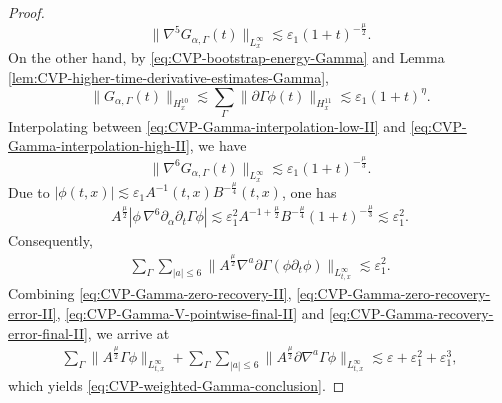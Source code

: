 \documentclass[11pt,twoside]{article}
\def\p{\partial}
\def\ve{\varepsilon}
\def\ls{\lesssim}
\theoremstyle{plain}
\theoremstyle{definition}
\theoremstyle{assumption}
\numberwithin{equation}{section}
\begin{document}
\begin{proof}
\begin{equation}
			\|\nabla^{5}G_{\alpha,\Gamma}(t)\|_{L^\infty_x}
			\ls
			\ve_1(1+t)^{-\frac{\mu}{2}}.
		\end{equation}
		On the other hand, by \eqref{eq:CVP-bootstrap-energy-Gamma} and Lemma \ref{lem:CVP-higher-time-derivative-estimates-Gamma},
		\begin{equation}
			\label{eq:CVP-Gamma-interpolation-high-II}
			\|G_{\alpha,\Gamma}(t)\|_{H^{10}_x}
			\ls
			\sum_{\Gamma}
			\|\p\Gamma\phi(t)\|_{H^{11}_x}
			\ls
			\ve_1(1+t)^\eta.
		\end{equation}
		Interpolating between
		\eqref{eq:CVP-Gamma-interpolation-low-II} and
		\eqref{eq:CVP-Gamma-interpolation-high-II}, we have
		\begin{equation}
			\label{eq:CVP-Gamma-interpolation-top-II}
			\|\nabla^{6}G_{\alpha,\Gamma}(t)\|_{L^\infty_x}
			\ls
			\ve_1(1+t)^{-\frac{\mu}{3}}.
		\end{equation}
		Due to $|\phi(t,x)|
		\ls
		\ve_1 A^{-1}(t,x)B^{-\frac{\mu}{4}}(t,x)$,
		one has
		\begin{equation}
			\label{eq:CVP-Gamma-recovery-top-error-II}
			\begin{aligned}
				A^{\frac{\mu}{2}}
				|\phi\,\nabla^{6}\p_\alpha\p_t\Gamma\phi|
				\ls
				\ve_1^2
				A^{-1+\frac{\mu}{2}}
				B^{-\frac{\mu}{4}}
				(1+t)^{-\frac{\mu}{3}}
				\ls
				\ve_1^2.
			\end{aligned}
		\end{equation}
		Consequently,
		\begin{equation}
			\label{eq:CVP-Gamma-recovery-error-final-II}
			\begin{aligned}
				\sum_{\Gamma}
				\sum_{|a|\le 6}
				\big\|
				A^{\frac{\mu}{2}}
				\nabla^a\p\Gamma(\phi\p_t\phi)
				\big\|_{L^\infty_{t,x}}
				\ls
				\ve_1^2.
			\end{aligned}
		\end{equation}
		Combining \eqref{eq:CVP-Gamma-zero-recovery-II},
		\eqref{eq:CVP-Gamma-zero-recovery-error-II},
		\eqref{eq:CVP-Gamma-V-pointwise-final-II} and
		\eqref{eq:CVP-Gamma-recovery-error-final-II}, we arrive at
		\begin{equation}
			\label{eq:CVP-Gamma-final-before-absorb-II}
			\begin{aligned}
				\sum_{\Gamma}
				\big\|
				A^{\frac{\mu}{2}}\Gamma\phi
				\big\|_{L^\infty_{t,x}}
				+
				\sum_{\Gamma}
				\sum_{|a|\le 6}
				\big\|
				A^{\frac{\mu}{2}}
				\p\nabla^a\Gamma\phi
				\big\|_{L^\infty_{t,x}}
				\ls
				\ve+\ve_1^2+\ve_1^3,
				\end{aligned}
		\end{equation}
		which yields \eqref{eq:CVP-weighted-Gamma-conclusion}.
	\end{proof}
	
\end{document}

